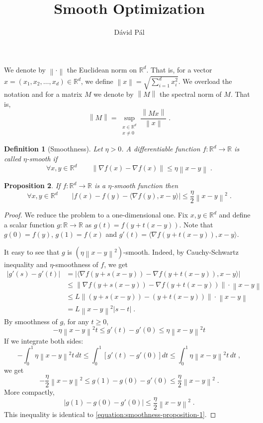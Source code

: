 \documentclass[12pt]{article}
\title{Smooth Optimization}
\author{D\'avid P\'al}
\newtheorem{definition}{Definition}
\newtheorem{proposition}[definition]{Proposition}
\newcommand{\R}{\mathbb{R}}
\newcommand{\grad}{\nabla}
\newcommand{\norm}[1]{\left\|#1\right\|}
\begin{document}
\maketitle

We denote by $\norm{\cdot}$ the Euclidean norm on $\R^d$. That is, for a vector $x = (x_1, x_2, \dots, x_d) \in \R^d$,
we define $\norm{x} = \sqrt{\sum_{i=1}^d x_i^2}$. We overload the notation and for a matrix $M$
we denote by $\norm{M}$ the spectral norm of $M$. That is,
$$
\norm{M} = \sup_{\substack{x \in \R^d \\ x \neq 0}} \frac{\norm{Mx}}{\norm{x}} \; .
$$

\begin{definition}[Smoothness]
Let $\eta > 0$. A differentiable function $f:\R^d \to \R$ is called \emph{$\eta$-smooth} if
\begin{equation}
\label{equation:smoothness-definition}
\forall x,y \in \R^d \qquad \norm{\grad f(x) - \grad f(x)} \le \eta \norm{x - y} \; .
\end{equation}
\end{definition}

\begin{proposition}
If $f:\R^d \to \R$ is a $\eta$-smooth function then
\begin{equation}
\label{equation:smoothness-proposition-1}
\forall x,y \in \R^d \qquad \left| f(x) - f(y) - \langle \grad f(y), x - y \rangle \right| \le \frac{\eta}{2} \norm{x - y}^2 \; .
\end{equation}
\end{proposition}

\begin{proof}
We reduce the problem to a one-dimensional one. Fix $x,y \in \R^d$
and define a scalar function $g:\R \to \R$ as $g(t) = f(y + t (x - y))$. Note
that $g(0) = f(y)$, $g(1) = f(x)$ and $g'(t) = \langle \grad f(y + t(x - y)), x -
y \rangle$.

It easy to see that $g$ is $(\eta \norm{x-y}^2)$-smooth. Indeed, by Cauchy-Schwartz inequality and $\eta$-smoothness of $f$, we get
\begin{align*}
|g'(s) - g'(t)|
& = \left| \langle \grad f(y + s(x - y)) - \grad f(y + t(x - y)), x - y \rangle \right| \\
& \le \norm{\grad f(y + s(x - y)) - \grad f(y + t(x - y))} \cdot \norm{x - y} \\
& \le L \norm{(y + s(x - y)) - (y + t(x - y))} \cdot \norm{x - y} \\
& = L \norm{x - y}^2 |s -  t| \; .
\end{align*}
By smoothness of $g$, for any $t \ge 0$,
$$
- \eta \norm{x-y}^2 t \le g'(t) - g'(0) \le \eta \norm{x-y}^2 t
$$
If we integrate both sides:
$$
- \int_0^1 \eta \norm{x-y}^2 t \, dt \le \int_0^1 \left[g'(t) - g'(0)\right] dt \le \int_0^1 \eta \norm{x-y}^2 t \, dt \; ,
$$
we get
$$
- \frac{\eta}{2} \norm{x-y}^2 \le g(1) - g(0) - g'(0) \le \frac{\eta}{2} \norm{x-y}^2 \; .
$$
More compactly,
$$
\left|g(1) - g(0) - g'(0)\right| \le \frac{\eta}{2} \norm{x-y}^2 \; .
$$
This inequality is identical to \eqref{equation:smoothness-proposition-1}.
\end{proof}
\end{document}
